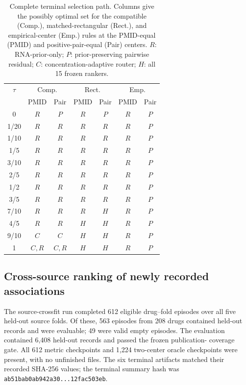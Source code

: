 \documentclass[preprint,review,12pt]{elsarticle}
\begin{document}
\begin{table}[t]
\centering
\caption{Complete terminal selection path. Columns give the possibly optimal
set for the compatible (Comp.), matched-rectangular (Rect.), and empirical-center
(Emp.) rules at the PMID-equal (PMID) and positive-pair-equal (Pair) centers.
\(R\): RNA-prior-only; \(P\): prior-preserving pairwise residual; \(C\):
concentration-adaptive router; \(H\): all 15 frozen rankers.}
\label{tab:selector-path}
\scriptsize
\begin{tabular}{c cc cc cc}
\toprule
\(\tau\) & \multicolumn{2}{c}{Comp.} & \multicolumn{2}{c}{Rect.} &
\multicolumn{2}{c}{Emp.} \\
& PMID & Pair & PMID & Pair & PMID & Pair \\
\midrule
0       & \(R\) & \(P\) & \(R\) & \(P\) & \(R\) & \(P\) \\
1/20    & \(R\) & \(R\) & \(R\) & \(R\) & \(R\) & \(P\) \\
1/10    & \(R\) & \(R\) & \(R\) & \(R\) & \(R\) & \(P\) \\
1/5     & \(R\) & \(R\) & \(R\) & \(R\) & \(R\) & \(P\) \\
3/10    & \(R\) & \(R\) & \(R\) & \(R\) & \(R\) & \(P\) \\
2/5     & \(R\) & \(R\) & \(R\) & \(R\) & \(R\) & \(P\) \\
1/2     & \(R\) & \(R\) & \(R\) & \(R\) & \(R\) & \(P\) \\
3/5     & \(R\) & \(R\) & \(R\) & \(R\) & \(R\) & \(P\) \\
7/10    & \(R\) & \(R\) & \(R\) & \(H\) & \(R\) & \(P\) \\
4/5     & \(R\) & \(R\) & \(H\) & \(H\) & \(R\) & \(P\) \\
9/10    & \(C\) & \(C\) & \(H\) & \(H\) & \(R\) & \(P\) \\
1       & \(C,R\) & \(C,R\) & \(H\) & \(H\) & \(R\) & \(P\) \\
\bottomrule
\end{tabular}
\end{table}

\subsection{Cross-source ranking of newly recorded associations}

The source-crossfit run completed 612 eligible drug--fold episodes over all five
held-out source folds. Of these, 563 episodes from 208 drugs contained held-out
records and were evaluable; 49 were valid empty episodes. The evaluation
contained 6,408 held-out records and passed the frozen publication-
coverage gate. All 612 metric checkpoints and 1,224 two-center oracle
checkpoints were present, with no unfinished files. The six terminal artifacts
matched their recorded SHA-256 values; the terminal summary hash was
\texttt{ab51bab0ab942a30...12fac503eb}.
\end{document}
